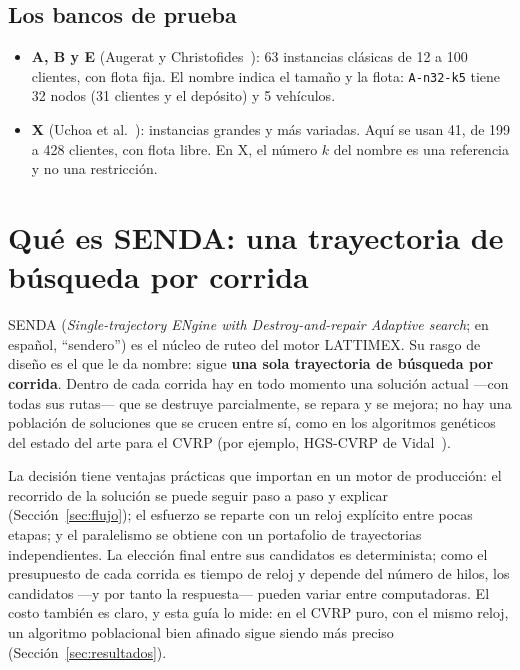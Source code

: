 \documentclass[11pt,a4paper]{article}
\newcommand{\tsl}[1]{\texttt{\small #1}}
\begin{document}
\subsection{Los bancos de prueba}
\begin{itemize}[leftmargin=1.5em]
\item \textbf{A, B y E} (Augerat y Christofides~\cite{augerat1995,christofides1969}): 63 instancias
clásicas de 12 a 100 clientes, con flota fija. El nombre indica el tamaño y la flota:
\tsl{A-n32-k5} tiene 32 nodos (31 clientes y el depósito) y 5 vehículos.
\item \textbf{X} (Uchoa et al.~\cite{uchoa2017}): instancias grandes y más variadas. Aquí se usan 41,
de 199 a 428 clientes, con flota libre. En X, el número $k$ del nombre es una referencia y no una
restricción.
\end{itemize}

\section{Qué es SENDA: una trayectoria de búsqueda por corrida}
\label{sec:senda}

SENDA (\emph{Single-trajectory ENgine with Destroy-and-repair Adaptive search}; en español,
``sendero'') es el núcleo de ruteo del motor LATTIMEX. Su rasgo de diseño es el que le da nombre:
sigue \textbf{una sola trayectoria de búsqueda por corrida}. Dentro de cada corrida hay en todo
momento una solución actual ---con todas sus rutas--- que se destruye parcialmente, se repara y se
mejora; no hay una población de soluciones que se crucen entre sí, como en los algoritmos genéticos del estado del arte para el CVRP (por ejemplo, HGS-CVRP de
Vidal~\cite{vidal2022hgs}).

La decisión tiene ventajas prácticas que importan en un motor de producción: el recorrido de la
solución se puede seguir paso a paso y explicar (Sección~\ref{sec:flujo}); el esfuerzo se reparte con
un reloj explícito entre pocas etapas; y el paralelismo se obtiene con un portafolio de trayectorias
independientes. La elección final entre sus candidatos es determinista; como el presupuesto de
cada corrida es tiempo de reloj y depende del número de hilos, los candidatos ---y por tanto la
respuesta--- pueden variar entre computadoras.
El costo también es claro, y esta guía lo mide: en el CVRP puro, con el mismo reloj, un algoritmo
poblacional bien afinado sigue siendo más preciso (Sección~\ref{sec:resultados}).
\end{document}
